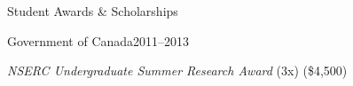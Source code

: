 \documentclass{resume}
\begin{document}
\begin{rSection}{Student Awards \& Scholarships}
\small




\begin{rSubsection}{Government of Canada}{2011--2013}{}{}
\item \textit{NSERC Undergraduate Summer Research Award} (3x) (\$4,500)
\end{rSubsection}



\end{rSection}
\end{document}
